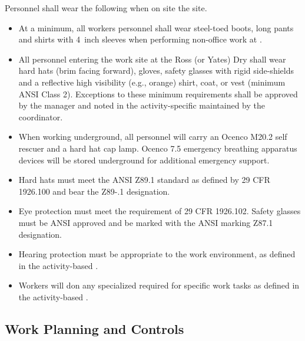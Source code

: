 Personnel shall wear the following  when on site the  site.
\begin{itemize}
\item At a minimum, all workers personnel shall wear
  steel-toed boots, long pants and shirts with 4~inch sleeves when
  performing non-office work at . 
  \item All personnel entering the work site at the Ross (or Yates) Dry
    shall wear hard hats (brim facing forward), gloves,
    safety glasses with rigid side-shields and a reflective high
    visibility (e.g., orange) shirt, coat, or vest (minimum ANSI Class 2).
    Exceptions to these minimum requirements shall be approved by the
      manager and noted in the
    activity-specific  maintained by the   coordinator.
  \item When working underground, all personnel will carry an Ocenco M20.2 self rescuer
    and a hard hat cap lamp.  Ocenco 7.5 emergency breathing apparatus devices
    will be stored underground for additional emergency support.
  \item Hard hats must meet the ANSI Z89.1 standard as defined by 29
    CFR 1926.100 and bear the Z89-.1 designation. 
   \item Eye protection must meet the requirement of 29 CFR
      1926.102. Safety glasses must be ANSI approved and be marked
      with the ANSI marking Z87.1 designation.
    \item Hearing protection must be appropriate to the work environment, as
      defined in the activity-based .
    \item Workers will don any specialized  required for specific work tasks as
      defined in the activity-based . 
\end{itemize}

\subsection{Work Planning and Controls}

